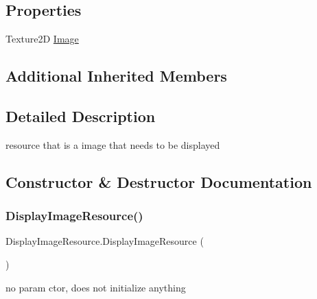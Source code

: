 \subsection*{Properties}
\begin{DoxyCompactItemize}
\item 
Texture2D \mbox{\hyperlink{class_display_image_resource_a6268f6612b7c533eafc2b6c8f91c2925}{Image}}
\end{DoxyCompactItemize}
\subsection*{Additional Inherited Members}


\subsection{Detailed Description}
resource that is a image that needs to be displayed 



\subsection{Constructor \& Destructor Documentation}
\mbox{\label{class_display_image_resource_a8c3e434da20e617201d74cfdb913817b}} 
\subsubsection{\texorpdfstring{Display\+Image\+Resource()}{DisplayImageResource()}\hspace{0.1cm}{\footnotesize\ttfamily [1/2]}}
{\footnotesize\ttfamily Display\+Image\+Resource.\+Display\+Image\+Resource (\begin{DoxyParamCaption}{ }\end{DoxyParamCaption})}



no param ctor, does not initialize anything 

\mbox{\label{class_display_image_resource_aa7b4bf3e8d324ea5b789322748b21b8e}} 

